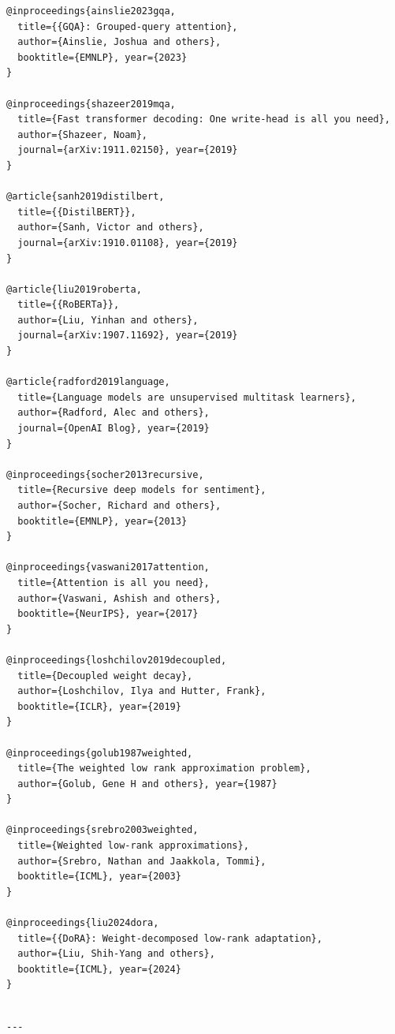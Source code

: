 \begin{lstlisting}
@inproceedings{ainslie2023gqa,
  title={{GQA}: Grouped-query attention},
  author={Ainslie, Joshua and others},
  booktitle={EMNLP}, year={2023}
}

@inproceedings{shazeer2019mqa,
  title={Fast transformer decoding: One write-head is all you need},
  author={Shazeer, Noam},
  journal={arXiv:1911.02150}, year={2019}
}

@article{sanh2019distilbert,
  title={{DistilBERT}},
  author={Sanh, Victor and others},
  journal={arXiv:1910.01108}, year={2019}
}

@article{liu2019roberta,
  title={{RoBERTa}},
  author={Liu, Yinhan and others},
  journal={arXiv:1907.11692}, year={2019}
}

@article{radford2019language,
  title={Language models are unsupervised multitask learners},
  author={Radford, Alec and others},
  journal={OpenAI Blog}, year={2019}
}

@inproceedings{socher2013recursive,
  title={Recursive deep models for sentiment},
  author={Socher, Richard and others},
  booktitle={EMNLP}, year={2013}
}

@inproceedings{vaswani2017attention,
  title={Attention is all you need},
  author={Vaswani, Ashish and others},
  booktitle={NeurIPS}, year={2017}
}

@inproceedings{loshchilov2019decoupled,
  title={Decoupled weight decay},
  author={Loshchilov, Ilya and Hutter, Frank},
  booktitle={ICLR}, year={2019}
}

@inproceedings{golub1987weighted,
  title={The weighted low rank approximation problem},
  author={Golub, Gene H and others}, year={1987}
}

@inproceedings{srebro2003weighted,
  title={Weighted low-rank approximations},
  author={Srebro, Nathan and Jaakkola, Tommi},
  booktitle={ICML}, year={2003}
}

@inproceedings{liu2024dora,
  title={{DoRA}: Weight-decomposed low-rank adaptation},
  author={Liu, Shih-Yang and others},
  booktitle={ICML}, year={2024}
}
\end{lstlisting}
\begin{lstlisting}

---
\end{lstlisting}